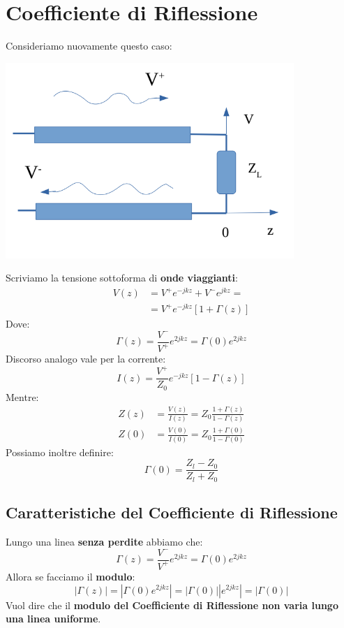\section{Coefficiente di Riflessione}
Consideriamo nuovamente questo caso:\\
\begin{center}
    \includegraphics[width=.5\textwidth]{Images/figure12.png}\\
\end{center}
Scriviamo la tensione sottoforma di \textbf{onde viaggianti}:
\begin{equation*}
\begin{aligned}
    V(z) &= V^+ e^{-jkz} + V^- e^{jkz} = \\
    &=  V^+ e^{-jkz} \left[1 + \Gamma(z)\right]
\end{aligned}
\end{equation*}
Dove:
\begin{equation*}
    \Gamma(z) = \frac{V^-}{V^+} e^{2jkz} = \Gamma(0) e^{2jkz} 
\end{equation*}
Discorso analogo vale per la corrente:
\begin{equation*}
    I(z) = \frac{V^+}{Z_0} e^{-jkz} \left[1 - \Gamma(z)\right]
\end{equation*}
Mentre:
\begin{equation*}
\begin{aligned}
    Z(z) &= \frac{V(z)}{I(z)} = Z_0 \frac{1 + \Gamma(z)}{1- \Gamma(z)} \\
    Z(0) &= \frac{V(0)}{I(0)} = Z_0 \frac{1 + \Gamma(0)}{1- \Gamma(0)}
\end{aligned}
\end{equation*}
Possiamo inoltre definire:
\begin{equation*}
    \Gamma(0) = \frac{Z_l - Z_0}{Z_l + Z_0}
\end{equation*}

\subsection{Caratteristiche del Coefficiente di Riflessione}
Lungo una linea \textbf{senza perdite} abbiamo che:
\begin{equation*}
    \Gamma(z) = \frac{V^-}{V^+} e^{2jkz} = \Gamma(0) e^{2jkz} 
\end{equation*}
Allora se facciamo il \textbf{modulo}:
\begin{equation*}
    |\Gamma(z)| = |\Gamma(0) e^{2jkz}| = |\Gamma(0)| |e^{2jkz}| = |\Gamma(0)|
\end{equation*}
Vuol dire che il \textbf{modulo del Coefficiente di Riflessione non varia lungo una linea uniforme}.\\ \\

